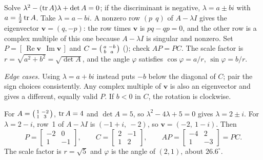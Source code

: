 \documentclass[10pt]{scrartcl}
\newcommand{\vv}[1]{\mathbf{#1}}
\begin{document}
\begin{steps}
  \ii Solve $\lambda^2-(\operatorname{tr} A)\lambda+\det A=0$; if the discriminant is negative, $\lambda=a\pm bi$ with $a=\tfrac12\operatorname{tr} A$.
  \ii Take $\lambda=a-bi$. A nonzero row $(p\ \ q)$ of $A-\lambda I$ gives the eigenvector $\vv v=(q,-p)$: the row times $\vv v$ is $pq-qp=0$, and the other row is a complex multiple of this one because $A-\lambda I$ is singular and nonzero.
  \ii Set $P=[\,\operatorname{Re}\vv v\ \ \operatorname{Im}\vv v\,]$ and $C=\begin{psmallmatrix}a&-b\\b&a\end{psmallmatrix}$ (); check $AP=PC$.
  \ii The scale factor is $r=\sqrt{a^2+b^2}=\sqrt{\det A}$, and the angle $\varphi$ satisfies $\cos\varphi=a/r$, $\sin\varphi=b/r$.
\end{steps}
\emph{Edge cases.} Using $\lambda=a+bi$ instead puts $-b$ below the diagonal of $C$; pair the sign choices consistently. Any complex multiple of $\vv v$ is also an eigenvector and gives a different, equally valid $P$. If $b<0$ in $C$, the rotation is clockwise.

\begin{example*}[A rotation--scaling factorization with $r=\sqrt5$]
For $A=\begin{psmallmatrix}1&-2\\1&3\end{psmallmatrix}$, $\operatorname{tr} A=4$ and $\det A=5$, so $\lambda^2-4\lambda+5=0$ gives $\lambda=2\pm i$. For $\lambda=2-i$, row~1 of $A-\lambda I$ is $(-1+i,\ -2)$, so $\vv v=(-2,\ 1-i)$. Then
\[
  P=\begin{bmatrix}-2&0\\1&-1\end{bmatrix},\qquad C=\begin{bmatrix}2&-1\\1&2\end{bmatrix},\qquad
  AP=\begin{bmatrix}-4&2\\1&-3\end{bmatrix}=PC.
\]
The scale factor is $r=\sqrt5$ and $\varphi$ is the angle of $(2,1)$, about $26.6^\circ$.
\end{example*}
\end{document}
